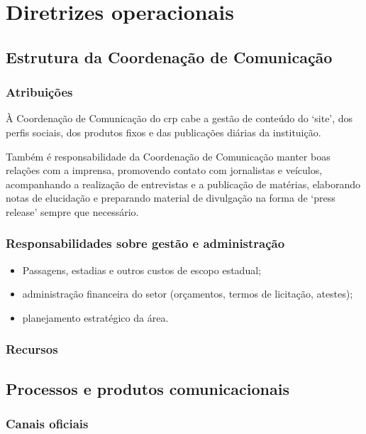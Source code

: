\chapter{Diretrizes operacionais}

\section{Estrutura da Coordenação de Comunicação}

\subsection{Atribuições}

À Coordenação de Comunicação do \ac{crp} cabe a gestão de conteúdo do `site', dos perfis sociais, dos produtos fixos e das publicações diárias da instituição.

Também é responsabilidade da Coordenação de Comunicação manter boas relações com a imprensa, promovendo contato com jornalistas e veículos, acompanhando a realização de entrevistas e a publicação de matérias, elaborando notas de elucidação e preparando material de divulgação na forma de `press release' sempre que necessário.

\subsection{Responsabilidades sobre gestão e administração}

\begin{itemize}
	\item
	Passagens, estadias e outros custos de escopo estadual;
	\item
	administração financeira do setor (orçamentos, termos de licitação,
	atestes);
	\item
	planejamento estratégico da área.
\end{itemize}

\subsection{Recursos}

\section{Processos e produtos comunicacionais}

\subsection{Canais oficiais}

